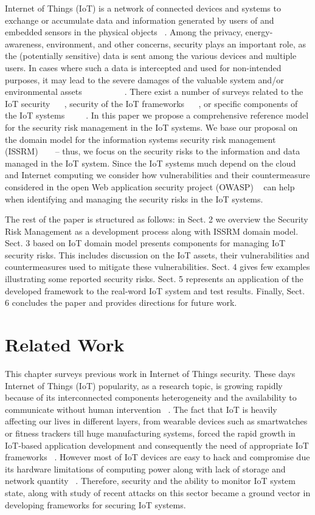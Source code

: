 \documentclass[12pt]{article}
\begin{document}
Internet of Things (IoT) is a network of connected devices and systems to exchange
or accumulate data and information generated by users of and embedded
sensors in the physical objects ~\cite{GSMA}. Among the privacy, energy-awareness, environment,
and other concerns, security plays an important role, as the (potentially
sensitive) data is sent among the various devices and multiple users. In cases
where such a data is intercepted and used for non-intended purposes, it may
lead to the severe damages of the valuable system and/or environmental assets
 ~\cite{GUARD} ~\cite{Ex2} ~\cite{Ex3} ~\cite{Ex4} ~\cite{Ex5} ~\cite{Ex6}. There exist a number of surveys related to the IoT
security ~\cite{PRISMS} ~\cite{IoTS}, security of the IoT frameworks ~\cite{MSM} ~\cite{IoTF}, or specific components
of the IoT systems ~\cite{ICAIC} ~\cite{EMS} ~\cite{DCN}. In this paper we propose a comprehensive reference
model for the security risk management in the IoT systems. We base our
proposal on the domain model for the information systems security risk management
(ISSRM) ~\cite{SAD} ~\cite{FSSM} – thus, we focus on the security risks to the information
and data managed in the IoT system. Since the IoT systems much depend on the
cloud and Internet computing we consider how vulnerabilities and their countermeasure
considered in the open Web application security project (OWASP) ~\cite{OWASP}
can help when identifying and managing the security risks in the IoT systems.

The rest of the paper is structured as follows: in Sect. 2 we overview the Security Risk Management as a development process along with ISSRM domain model. Sect. 3 based on IoT domain model presents components for managing IoT security risks. This includes discussion on the IoT assets, their vulnerabilities and countermeasures used to mitigate these vulnerabilities. Sect. 4 gives few examples illustrating some reported security risks. Sect. 5 represents an application of the developed framework to the real-word IoT system and test results. Finally, Sect. 6 concludes the paper and provides directions for future work.

\newpage
\section{Related Work}
This chapter surveys previous work in Internet of Things security. These days Internet of Things (IoT) popularity, as a research topic, is growing rapidly because of its interconnected components heterogeneity and the availability to communicate without human intervention ~\cite{IoTSur}. The fact that IoT is heavily affecting our lives in different layers, from wearable devices such as smartwatches or fitness trackers till huge manufacturing systems, forced the rapid growth in IoT-based application development and consequently the need of appropriate IoT frameworks ~\cite{IoTSF}. However most of IoT devices are easy to hack and compromise due its hardware limitations of computing power along with lack of storage and network quantity ~\cite{IoTCO}. Therefore, security and the ability to monitor IoT system state, along with study of recent attacks on this sector became a ground vector in developing frameworks for securing IoT systems.        
\end{document}
